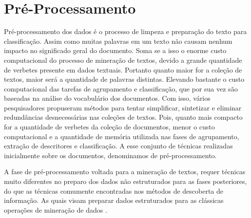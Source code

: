 %
%


\section{Pré-Processamento} Pré-processamento dos dados é o processo de limpeza e preparação do
texto para classificação.  Assim como muitas palavras em um texto não causam nenhum impacto no
significado geral do documento\cite{Haddi2013}.  Soma se a isso o enorme custo computacional do
processo de mineração de textos, devido a grande quantidade de verbetes presente em dados textuais.
Portanto quanto maior for a coleção de textos, maior será a quantidade de palavras distintas.
Elevando bastante o custo computacional das tarefas de agrupamento e classificação, que por sua vez
são baseadas na análise do vocabulário dos documentos.  Com isso, vários pesquisadores propuseram
métodos para tentar simplificar, sintetizar e eliminar redundâncias desnecessárias nas coleções de
textos.  Pois, quanto mais compacto for a quantidade de verbetes da coleção de documentos, menor o
custo computacional e a quantidade de memória utilizada nas fases de agrupamento, extração de
descritores e classificação. A esse conjunto de técnicas realizadas inicialmente sobre os
documentos, denominamos de pré-processamento. 

A fase de pré-processamento voltada para a mineração de textos, requer técnicas muito diferentes no
preparo dos dados não estruturados para as fases posteriores, do que as técnicas comumente
encontradas nos métodos de descoberta de informação. As quais visam preparar dados estruturados para
as clássicas operações de mineração de dados \cite{Feldman2007}.

